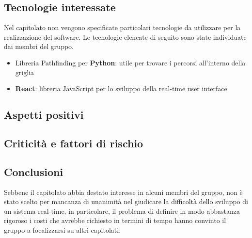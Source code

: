 \subsection{Tecnologie interessate}
Nel capitolato non vengono specificate particolari tecnologie da utilizzare per la realizzazione del software. Le tecnologie elencate di seguito sono state individuate dai membri del gruppo.
\begin{itemize}
    \item Libreria Pathfinding per \textbf{Python}: utile per trovare i percorsi all’interno della griglia
    \item \textbf{React}: libreria JavaScript per lo sviluppo della real-time user interface
\end{itemize}
\subsection{Aspetti positivi}
\subsection{Criticità e fattori di rischio}
\subsection{Conclusioni}
Sebbene il capitolato abbia destato interesse in alcuni membri del gruppo, non è stato scelto per mancanza di unanimità nel giudicare la difficoltà dello sviluppo di un sistema real-time, in particolare, il problema di definire in modo abbastanza rigoroso i costi che avrebbe richiesto in termini di tempo hanno convinto il gruppo a focalizzarsi su altri capitolati. 